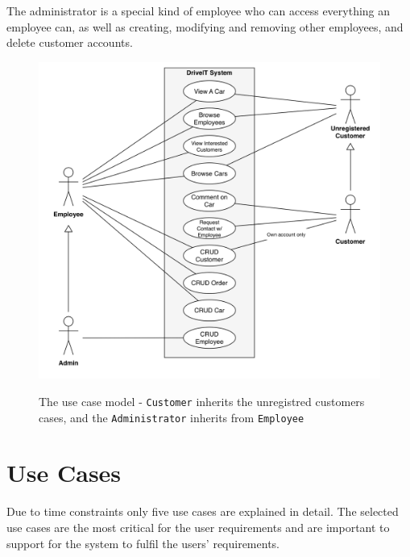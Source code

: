 The administrator is a special kind of employee who can access everything an employee can, as well as creating, modifying and removing other employees, and delete customer accounts.\\

\begin{figure}[H]
    \centering
        \includegraphics[scale=0.4]{Figures/UseCase-Model}\\
    \caption{The use case model - \texttt{Customer} inherits the unregistred customers cases, and the \texttt{Administrator} inherits from \texttt{Employee}}
  \label{fig:UseCaseModel}
\end{figure}

\newpage
\section{Use Cases}
Due to time constraints only five use cases are explained in detail. The selected use cases are the most critical for the user requirements and are important to support for the system to fulfil the users' requirements.










